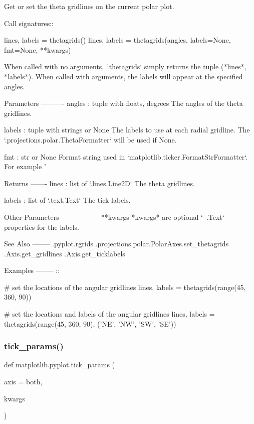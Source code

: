 \begin{DoxyVerb}Get or set the theta gridlines on the current polar plot.

Call signatures::

 lines, labels = thetagrids()
 lines, labels = thetagrids(angles, labels=None, fmt=None, **kwargs)

When called with no arguments, `.thetagrids` simply returns the tuple
(*lines*, *labels*). When called with arguments, the labels will
appear at the specified angles.

Parameters
----------
angles : tuple with floats, degrees
    The angles of the theta gridlines.

labels : tuple with strings or None
    The labels to use at each radial gridline. The
    `.projections.polar.ThetaFormatter` will be used if None.

fmt : str or None
    Format string used in `matplotlib.ticker.FormatStrFormatter`.
    For example '%

Returns
-------
lines : list of `.lines.Line2D`
    The theta gridlines.

labels : list of `.text.Text`
    The tick labels.

Other Parameters
----------------
**kwargs
    *kwargs* are optional `~.Text` properties for the labels.

See Also
--------
.pyplot.rgrids
.projections.polar.PolarAxes.set_thetagrids
.Axis.get_gridlines
.Axis.get_ticklabels

Examples
--------
::

  # set the locations of the angular gridlines
  lines, labels = thetagrids(range(45, 360, 90))

  # set the locations and labels of the angular gridlines
  lines, labels = thetagrids(range(45, 360, 90), ('NE', 'NW', 'SW', 'SE'))
\end{DoxyVerb}
 \mbox{\label{namespacematplotlib_1_1pyplot_a7e3389a55f1ab84f5fb9b6c487b380a1}} 
\subsubsection{\texorpdfstring{tick\+\_\+params()}{tick\_params()}}
{\footnotesize\ttfamily def matplotlib.\+pyplot.\+tick\+\_\+params (\begin{DoxyParamCaption}\item[{}]{axis = {\ttfamily \textquotesingle{}both\textquotesingle{}},  }\item[{}]{kwargs }\end{DoxyParamCaption})}

